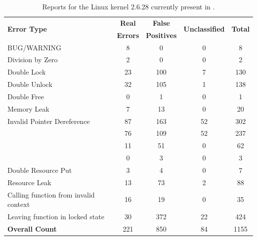 \begin{table}[tb]
\begin{center}
\small
\setlength{\tabcolsep}{2.5pt}
\begin{tabular}{|l||c|c|c||c|} \hline
\multirow{2}{*}{\textbf{Error Type}} &
  \textbf{Real} & \textbf{False} &
  \multirow{2}{*}{\textbf{Unclassified}} &
  \multirow{2}{*}{\textbf{Total}} \\ 
& \textbf{Errors} & \textbf{Positives} & & \\ \hline\hline
BUG/WARNING                 &  8 &   0 & 0 &   8 \\
Division by Zero            &  2 &   0 & 0 &   2 \\
Double Lock                 & 23 & 100 & 7 & 130 \\
Double Unlock               & 32 & 105 & 1 & 138 \\
Double Free                 &  0 &   1 & 0 &   1 \\
Memory Leak                 &  7 &  13 & 0 &  20 \\
Invalid Pointer Dereference & 87 & 163 &52 & 302 \\ 
\hspace{1em}\cellcolor{black!10}{\footnotesize NULL Pointer Dereference} & 
  \cellcolor{black!10}\footnotesize 76 & \cellcolor{black!10}\footnotesize 109& 
  \cellcolor{black!10}\footnotesize 52 & \cellcolor{black!10}\footnotesize 237\\
\hspace{1em}\cellcolor{black!10}{\footnotesize ERR\_PTR() Dereference} & 
  \cellcolor{black!10}\footnotesize 11 & \cellcolor{black!10}\footnotesize 51 & 
  \cellcolor{black!10}\footnotesize  0 & \cellcolor{black!10}\footnotesize 62 \\
\hspace{1em}\cellcolor{black!10}{\footnotesize Use After Free} & 
  \cellcolor{black!10}\footnotesize 0 & \cellcolor{black!10}\footnotesize 3 & 
  \cellcolor{black!10}\footnotesize 0 & \cellcolor{black!10}\footnotesize 3 \\
Double Resource Put                   &   3 &   4 &  0 &   7 \\
Resource Leak                         &  13 &  73 &  2 &  88 \\
Calling function from invalid context &  16 &  19 &  0 &  35 \\
Leaving function in locked state      &  30 & 372 & 22 & 424 \\ \hline\hline
\textbf{Overall Count}                & 221 & 850 & 84 &1155 \\ \hline
\end{tabular}
\end{center}
\caption{Reports for the Linux kernel 2.6.28 currently present in \cdb.}
\label{tab:reports}
\end{table}

